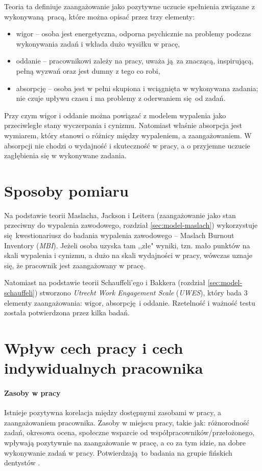 Teoria ta definiuje zaangażowanie jako pozytywne uczucie spełnienia związane z wykonywaną pracą, które można opisać przez trzy elementy:
\begin{itemize}
\item wigor -- osoba jest energetyczna, odporna psychicznie na problemy podczas wykonywania zadań i wkłada dużo wysiłku w pracę,
\item oddanie -- pracownikowi zależy na pracy, uważa ją za znaczącą, inspirującą, pełną wyzwań oraz jest dumny z tego co robi,
\item absorpcję -- osoba jest w pełni skupiona i wciągnięta w wykonywana zadania; nie czuje upływu czasu i ma problemy z oderwaniem się od zadań.
\end{itemize}
Przy czym wigor i oddanie można powiązać z modelem wypalenia jako przeciwległe stany wyczerpania i cynizmu. Natomiast właśnie absorpcja jest wymiarem, który stanowi o różnicy między wypaleniem, a zaangażowaniem. W absorpcji nie chodzi o wydajność i skuteczność w pracy, a o przyjemne uczucie zagłębienia się w wykonywane zadania.

\section{Sposoby pomiaru}
Na podstawie teorii Maslacha, Jackson i Leitera (zaangażowanie jako stan przeciwny do wypalenia zawodowego, rozdział \ref{sec:model-maslach}) wykorzystuje się kwestionariusz do badania wypalenia zawodowego -- Maslach Burnout Inventory (\emph{MBI}). Jeżeli osoba uzyska tam ,,złe" wyniki, tzn. mało punktów na skali wypalenia i cynizmu, a dużo na skali wydajności w pracy, wówczas uznaje się, że pracownik jest zaangażowany w pracę.

Natomiast na podstawie teorii Schauffeli'ego i Bakkera (rozdział \ref{sec:model-schauffeli}) stworzono \emph{Utrecht Work Engagement Scale} (\emph{UWES}), który bada 3 elementy zaangażowania: wigor, absorpcję i oddanie. Rzetelność i ważność testu została potwierdzona przez kilka badań.

\section{Wpływ cech pracy i cech indywidualnych pracownika}
\label{sec:theory-eng-infl}
\paragraph{Zasoby w pracy}
Istnieje pozytywna korelacja między dostępnymi zasobami w pracy, a zaangażowaniem pracownika. Zasoby w miejscu pracy, takie jak: różnorodność zadań, okresowa ocena, społeczne wsparcie od współpracowników/przełożonego, wpływają pozytywnie na zaangażowanie w pracę, a co za tym idzie, na dobre wykonywanie zadań w pracy. Potwierdzają to badania na grupie fińskich dentystów \cite{hakanen2008positive}.
